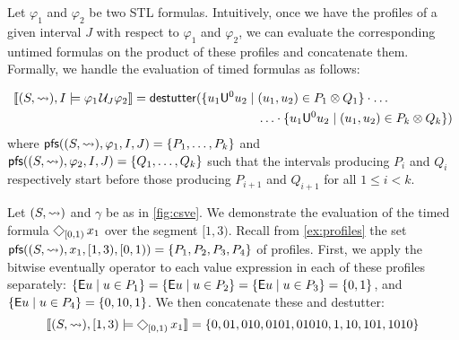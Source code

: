 Let $\varphi_1$ and $\varphi_2$ be two STL formulas.
Intuitively, once we have the profiles of a given interval $J$ with respect to $\varphi_1$ and $\varphi_2$, we can evaluate the corresponding untimed formulas on the product of these profiles and concatenate them.
Formally, we handle the evaluation of timed formulas as follows:

\vspace{-1em}
\small
\begin{align*}
	\llbracket (S, {\hb}), I \models \varphi_1 \until_J \varphi_2 \rrbracket = \destutter( \{ u_1 \mathsf{U}^0 u_2 \st &(u_1, u_2) \in P_1 \otimes Q_1 \} \cdot \ldots \\ 
	&\ldots \cdot \{ u_1 \mathsf{U}^0 u_2 \st (u_1, u_2) \in P_k \otimes Q_k \} )
\end{align*}
\normalsize
where $\mathsf{pfs}((S,{\rightsquigarrow}), \varphi_1, I, J) = \{P_1, \ldots, P_k \}$ and $\mathsf{pfs}((S,{\rightsquigarrow}), \varphi_2, I, J) = \{Q_1, \ldots, Q_k \}$ such that the intervals producing $P_i$ and $Q_i$ respectively start before those producing $P_{i+1}$ and $Q_{i+1}$ for all $1 \leq i < k$.



\begin{example} \label{ex:timed}
	Let $(S, {\rightsquigarrow})$ and $\gamma$ be as in \cref{fig:csve}.
	We demonstrate the evaluation of the timed formula $\LTLeventually_{[0,1)} x_1$ over the segment $[1,3)$.
	Recall from \cref{ex:profiles} the set $\mathsf{pfs}((S,{\rightsquigarrow}), x_1, [1,3), [0,1)) = \{P_1, P_2, P_3, P_4\}$ of profiles.
	First, we apply the bitwise eventually operator to each value expression in each of these profiles separately:
	$\{ \mathsf{E} u \st u \in P_1 \} = \{ \mathsf{E} u \st u \in P_2 \} = \{ \mathsf{E} u \st u \in P_3 \} = \{ 0, 1 \}$, and $\{ \mathsf{E} u \st u \in P_4 \} = \{ 0, 10, 1 \}$.
	We then concatenate these and destutter:
	\[ 	\llbracket (S, {\hb}), [1,3) \models \LTLeventually_{[0,1)} x_1 \rrbracket = \{ 0, 01, 010, 0101, 01010, 1, 10, 101, 1010 \}  \]
\end{example}

